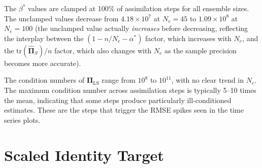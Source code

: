 The $\beta^*$ values are clamped at 100\% of assimilation steps for all ensemble sizes. The unclamped values decrease from $4.18 \times 10^7$ at $N_e = 45$ to $1.09 \times 10^8$ at $N_e = 100$ (the unclamped value actually \emph{increases} before decreasing, reflecting the interplay between the $(1 - n/N_e - \alpha^*)$ factor, which increases with $N_e$, and the $\text{tr}(\hat{\boldsymbol{\Pi}}_S)/n$ factor, which also changes with $N_e$ as the sample precision becomes more accurate).

The condition numbers of $\boldsymbol{\Pi}_{\text{LS}}$ range from $10^8$ to $10^{11}$, with no clear trend in $N_e$. The maximum condition number across assimilation steps is typically 5--10 times the mean, indicating that some steps produce particularly ill-conditioned estimates. These are the steps that trigger the RMSE spikes seen in the time series plots.

\section{Scaled Identity Target}
\label{app:diag_scaled}

